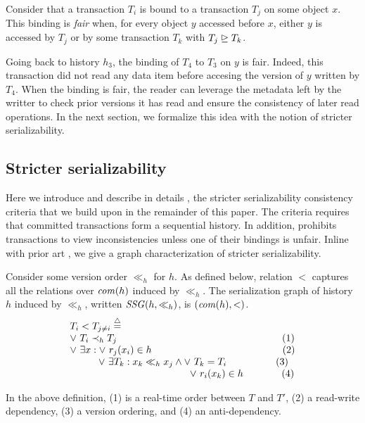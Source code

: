 \begin{definition}
  Consider that a transaction $T_i$ is bound to a transaction $T_j$ on some object $x$.
  This binding is \emph{fair} when, for every object $y$ accessed before $x$, either $y$ is accessed by $T_j$ or by some transaction $T_k$ with $T_j \mathrel{\unrhd} T_k$.
\end{definition}

Going back to history $h_3$, the binding of $T_4$ to $T_3$ on $y$ is fair.
Indeed, this transaction did not read any data item before accesing the version of $y$ written by $T_4$.
When the binding is fair, the reader can leverage the metadata left by the writter to check prior versions it has read and ensure the consistency of later read operations.
In the next section, we formalize this idea with the notion of stricter serializability.

\subsection{Stricter serializability}
Here we introduce and describe in details \SPSER, the stricter serializability consistency criteria that we build upon in the remainder of this paper.
The \sser criteria requires that committed transactions form a sequential history.
In addition, \sser prohibits transactions to view inconsistencies unless one of their bindings is unfair.
Inline with prior art \cite{berstein,opa}, we give a graph characterization of stricter serializability.

\begin{definition}
  Consider some version order $\ll_h$ for $h$.
  As defined below, relation $<$ captures all the relations over $\committed{h}$ induced by $\ll_h$.
  The serialization graph of history $h$ induced by $\ll_h$, written $\SSG(h,\ll_h)$, is $(\committed{h},<)$.
  \begin{displaymath}
    \begin{array}{l}
      T_i < T_{j \neq i}  \equaldef \\
      \lor~ T_i \hb_h T_j {\hspace{16.8em}\text{(1)}} \\
      \lor~ \exists x : \lor~ r_j(x_i) \in h {\hspace{13.3em}\text{(2)}} \\
      \hspace{2.9em}\lor~ \exists T_k : x_k \ll_h x_j \land \lor~T_k = T_i {\hspace{5em}\text{(3)}} \\
      \hspace{12.2em} \lor~ r_i(x_k) \in h {\hspace{3.9em}\text{(4)}}
    \end{array}
  \end{displaymath}  
\end{definition}
In the above definition, (1) is a real-time order between $T$ and $T'$, (2) a read-write dependency, (3) a version ordering, and (4) an anti-dependency.

